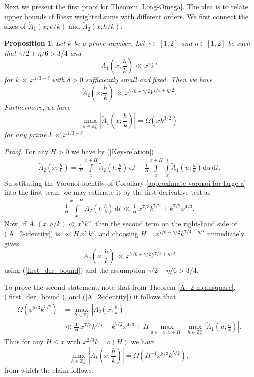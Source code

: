 \documentclass[a4paper,10pt,twoside]{amsart}
\newtheorem{proposition}[theorem]{Proposition}
\theoremstyle{definition}
\numberwithin{equation}{section}
\renewcommand\:{\colon}
\begin{document}
\noindent Next we present the first proof for Theorem \ref{Long-Omega}. The idea is to relate upper bounds of Riesz weighted sums with different orders. We first connect the sizes of $\widetilde A_1(x;h/k)$ and $\widetilde A_2(x;h/k)$. 
\begin{proposition}\label{A2toA1}
Let $k$ be a prime number. Let $\gamma\in\left[1,2\right]$ and $\eta\in\left[1,2\right]$ be such that $\gamma/2+\eta/6> 3/4$ and
\[\widetilde A_1\left(x;\frac hk\right)\ll x^\gamma k^\eta\]
for $k\ll x^{1/3-\delta}$ with $\delta>0$ sufficiently small and fixed. Then we have
\[\widetilde A_2\left(x;\frac hk\right)\ll x^{7/6+\gamma/2}k^{7/4+\eta/2}.\]
Furthermore, we have
\[\underset{h\in\mathbb Z_k^\times}{\max}\left|\widetilde A_1\left(x;\frac hk\right)\right|=\Omega\left(xk^{3/2}\right)\]
for any prime $k\ll x^{1/3-\delta}$.
\end{proposition}

\begin{proof}
For any $H>0$ we have by (\ref{Key-relation})
\begin{align}\label{A_2-identity}
\widetilde A_2\left(x;\frac hk\right)=\frac1H\int\limits_x^{x+H}\widetilde A_2\left(t;\frac hk\right)\,\mathrm dt
-\frac1H\int\limits_x^{x+H}\int\limits_x^t\widetilde A_1\left(u;\frac hk\right)\,\mathrm du\,\mathrm dt.
\end{align}
Substituting the Voronoi identity of Corollary \ref{approximate-voronoi-for-large-a} into the first term, we may estimate it by the first derivative test as
\begin{align}\label{first_der_bound}
\frac1H\int\limits_x^{x+H}\widetilde A_2\left(t;\frac hk\right)\,\mathrm dt\ll\frac1H\,x^{7/3}k^{7/2}+k^{7/2}x^{4/3}.
\end{align}
Now, if $\widetilde A_1(x,h/k)\ll x^\gamma k^\eta$, then the second term on the right-hand side of (\ref{A_2-identity}) is $\ll H\,x^\gamma\,k^\eta$, and choosing $H=x^{7/6-\gamma/2}k^{7/4-\eta/2}$ immediately gives
\[\widetilde A_2\left(x;\frac hk\right)\ll x^{7/6+\gamma/2}k^{7/4+\eta/2}\]
using (\ref{first_der_bound}) and the assumption $\gamma/2+\eta/6>3/4$.

To prove the second statement, note that from Theorem \ref{A_2-meansquare}, (\ref{first_der_bound}), and (\ref{A_2-identity}) it follows that
\begin{align*}
\Omega\left(x^{5/3}k^{5/2}\right)&=\max_{h\in\mathbb Z_k^\times}\left|\widetilde A_2\left(x;\frac hk\right)\right|\\
&\ll \frac1H\,x^{7/3}k^{7/2}+k^{7/2}x^{4/3}+H\max_{u\in[x,x+H]}\max_{h\in\mathbb Z_k^\times}\left|\widetilde A_1\left(u;\frac hk\right)\right|.
\end{align*}
Thus for any $H\leq x$ with $x^{2/3}k=o(H)$ we have 
\[
\max_{h\in\mathbb Z_k^\times}\left|\widetilde A_1\left(x;\frac hk\right)\right|=\Omega\left(H^{-1}x^{5/3}k^{5/2}\right),\]
from which the claim follows. 
\end{proof}
       
\end{document}

